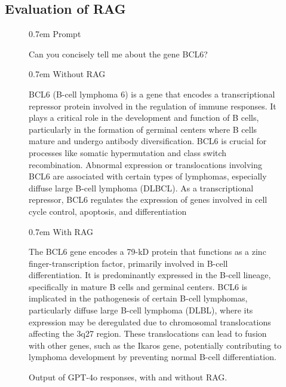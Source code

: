 \subsection{Evaluation of RAG}\label{subsec:rag_eval}
\begin{figure}[htbp]
    \scriptsize 
    {\parindent0.7em \indent Prompt}
    
    \begin{tcolorbox}[
        on line, colframe=darkgray,colback=mypurple,
        boxrule=0.8pt,arc=7pt,boxsep=0pt,left=6pt,
        right=6pt,top=6pt,bottom=6pt
    ]
    Can you concisely tell me about the gene BCL6?
    \end{tcolorbox}
    
    \vspace{0.5em}
    
    {\parindent0.7em Without RAG}

    \begin{tcolorbox}[
        on line, colframe=darkgray,colback=mygray,
        boxrule=0.8pt,arc=7pt,boxsep=0pt,left=6pt,
        right=6pt,top=6pt,bottom=6pt
    ]
    BCL6 (B-cell lymphoma 6) is a gene that encodes a transcriptional repressor protein involved in the regulation of immune responses. It plays a critical role in the development and function of B cells, particularly in the formation of germinal centers where B cells mature and undergo antibody diversification. BCL6 is crucial for processes like somatic hypermutation and class switch recombination. Abnormal expression or translocations involving BCL6 are associated with certain types of lymphomas, especially diffuse large B-cell lymphoma (DLBCL). As a transcriptional repressor, BCL6 regulates the expression of genes involved in cell cycle control, apoptosis, and differentiation
    \end{tcolorbox}

    \vspace{0.5em}
    
    {\parindent0.7em With RAG}

    \begin{tcolorbox}[
        on line, colframe=darkgray,colback=pink,
        boxrule=0.8pt,arc=7pt,boxsep=0pt,left=6pt,
        right=6pt,top=6pt,bottom=6pt
    ]
    The BCL6 gene encodes a 79-kD protein that functions as a zinc finger-transcription factor, primarily involved in B-cell differentiation. It is predominantly expressed in the B-cell lineage, specifically in mature B cells and germinal centers. BCL6 is implicated in the pathogenesis of certain B-cell lymphomas, particularly diffuse large B-cell lymphoma (DLBL), where its expression may be deregulated due to chromosomal translocations affecting the 3q27 region. These translocations can lead to fusion with other genes, such as the Ikaros gene, potentially contributing to lymphoma development by preventing normal B-cell differentiation.
    \end{tcolorbox}    
    \caption{Output of GPT-4o responses, with and without RAG.}
    \label{fig:rag_gpt_outputs}
\end{figure}

